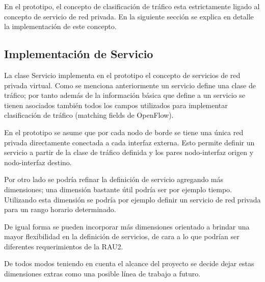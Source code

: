 En el prototipo, el concepto de clasificaci\'on de tr\'afico esta estrictamente ligado al concepto de servicio de red privada. En la siguiente secci\'on se explica en detalle la implementaci\'on de este concepto.
 
\subsection{Implementación de Servicio}

La clase Servicio implementa en el prototipo el concepto de servicios de red privada virtual. Como se menciona anteriormente un servicio define una clase de tr\'afico; por tanto adem\'as de la informaci\'on b\'asica que define a un servicio se tienen asociados tambi\'en todos los campos utilizados para implementar clasificaci\'on de tr\'afico (matching fields de OpenFlow).

En el prototipo se asume que por cada nodo de borde  se tiene una \'unica red privada directamente conectada a cada interfaz externa. Esto permite definir un servicio a partir de la clase de tr\'afico definida y los pares nodo-interfaz origen y nodo-interfaz destino.

Por otro lado se podr\'ia refinar la definici\'on de servicio agregando m\'as dimensiones; una dimensi\'on bastante \'util podr\'ia ser por ejemplo tiempo. Utilizando esta dimensi\'on se podr\'ia por ejemplo definir un servicio de red privada para un rango horario determinado.

De igual forma se pueden incorporar m\'as dimensiones orientado a brindar una mayor flexibilidad en la definici\'on de servicios, de cara a lo que podr\'ian ser diferentes requerimientos de la RAU2. 

De todos modos teniendo en cuenta el alcance del proyecto se decide dejar estas dimensiones extras como una posible l\'inea de trabajo a futuro.\\ 






